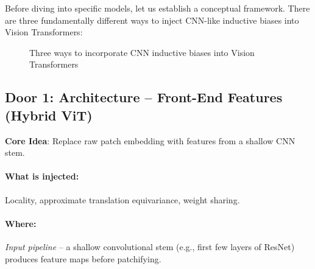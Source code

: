 \documentclass{article}
\begin{document}
Before diving into specific models, let us establish a conceptual framework. There are three fundamentally different ways to inject CNN-like inductive biases into Vision Transformers:

\begin{figure}[h]
\centering
{}
\caption{Three ways to incorporate CNN inductive biases into Vision Transformers}
\end{figure}

\subsection{Door 1: Architecture -- Front-End Features (Hybrid ViT)}

\textbf{Core Idea}: Replace raw patch embedding with features from a shallow CNN stem.

\paragraph{What is injected:} Locality, approximate translation equivariance, weight sharing.

\paragraph{Where:} \textit{Input pipeline} -- a shallow convolutional stem (e.g., first few layers of ResNet) produces feature maps before patchifying.
\end{document}
